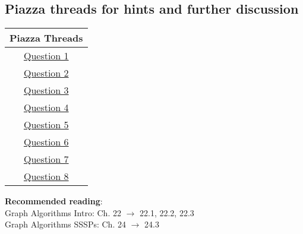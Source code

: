 \documentclass[12pt]{article}
\begin{document}
\hrulefill
\pagebreak

\subsection*{Piazza threads for hints and further discussion}
\begin{center}
    \begin{tabular}{|c|}
    \hline
    Piazza Threads \\ [0.5ex] 
    \hline \hline 
    \href{https://piazza.com/class/ka2roz7rb9m3j4?cid=87}{Question 1}\\
    \href{https://piazza.com/class/ka2roz7rb9m3j4?cid=88}{Question 2}\\
    \href{https://piazza.com/class/ka2roz7rb9m3j4?cid=89}{Question 3}\\
    \href{https://piazza.com/class/ka2roz7rb9m3j4?cid=90}{Question 4}\\
    \href{https://piazza.com/class/ka2roz7rb9m3j4?cid=91}{Question 5}\\
    \href{https://piazza.com/class/ka2roz7rb9m3j4?cid=92}{Question 6}\\
    \href{https://piazza.com/class/ka2roz7rb9m3j4?cid=93}{Question 7}\\
    \href{https://piazza.com/class/ka2roz7rb9m3j4?cid=94}{Question 8}\\
    \hline
    \end{tabular}
\end{center}

\textbf{Recommended reading}: \\
Graph Algorithms Intro: Ch. 22 $\to$ 22.1, 22.2, 22.3 \\
Graph Algorithms SSSPs: Ch. 24 $\to$ 24.3
\\

\pagebreak
\end{document}
